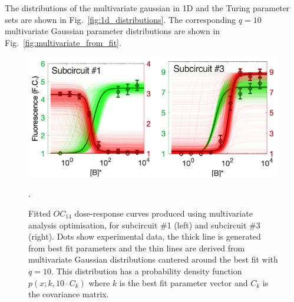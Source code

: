 The distributions of the multivariate gaussian in 1D and the Turing parameter sets are shown in Fig.~\ref{fig:1d_distributions}.
The corresponding $q=10$ multivariate Gaussian parameter distributions are shown in Fig.~\ref{fig:multivariate_from_fit}.
\begin{figure}[H] %
    \centering
    \begin{adjustbox}{center}
        \includegraphics[width=1\textwidth]{chapters/Chapter 2/dose_response_multivariate_gaussian} %
    \end{adjustbox}
    \caption{Fitted $OC_14$ dose-response curves
    produced using multivariate analysis optimisation, for subcircuit \#1 (left) and subcircuit \#3 (right).
    Dots show experimental data,
        the thick line is generated from best fit parameters and the thin lines are derived from multivariate Gaussian distributions cantered around the best fit with $q=10$.
    This distribution has a probability density function $p(x;k,10\cdot C_{k})$
        where $k$ is the best fit parameter vector and $C_{k}$ is the covariance matrix.}.
    \label{fig:dose_response_multivariate_gaussian} %
\end{figure}


